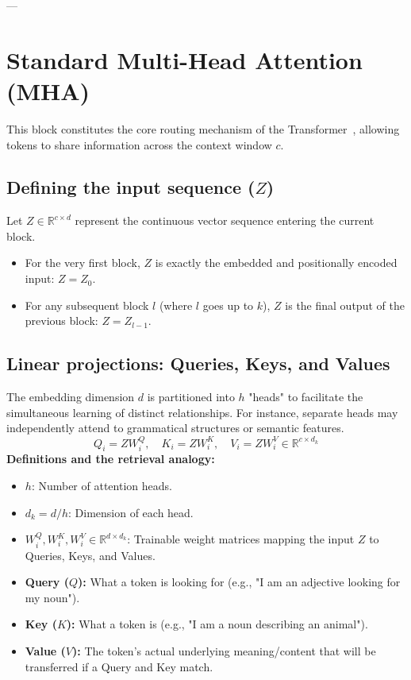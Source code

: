 \documentclass[11pt]{article}
\begin{document}
	---
	
	\section{Standard Multi-Head Attention (MHA)}
	This block constitutes the core routing mechanism of the Transformer~\cite{vaswani2017attention}, allowing tokens to share information across the context window $c$.
	
	\subsection{Defining the input sequence ($Z$)}
	Let $Z \in \mathbb{R}^{c \times d}$ represent the continuous vector sequence entering the current block.
	\begin{itemize}
		\item For the very first block, $Z$ is exactly the embedded and positionally encoded input: $Z = Z_0$.
		\item For any subsequent block $l$ (where $l$ goes up to $k$), $Z$ is the final output of the previous block: $Z = Z_{l-1}$.
	\end{itemize}
	
	\subsection{Linear projections: Queries, Keys, and Values}
	The embedding dimension $d$ is partitioned into $h$ "heads" to facilitate the simultaneous learning of distinct relationships. For instance, separate heads may independently attend to grammatical structures or semantic features.
	\begin{equation}
		Q_i = Z W_i^Q, \quad K_i = Z W_i^K, \quad V_i = Z W_i^V \in \mathbb{R}^{c \times d_k}
	\end{equation}
	\textbf{Definitions and the retrieval analogy:}
	\begin{itemize}
		\item $h$: Number of attention heads.
		\item $d_k = d/h$: Dimension of each head.
		\item $W_i^Q, W_i^K, W_i^V \in \mathbb{R}^{d \times d_k}$: Trainable weight matrices mapping the input $Z$ to Queries, Keys, and Values.
		\item \textbf{Query ($Q$):} What a token is looking for (e.g., "I am an adjective looking for my noun").
		\item \textbf{Key ($K$):} What a token is (e.g., "I am a noun describing an animal").
		\item \textbf{Value ($V$):} The token's actual underlying meaning/content that will be transferred if a Query and Key match.
	\end{itemize}
	
\end{document}
